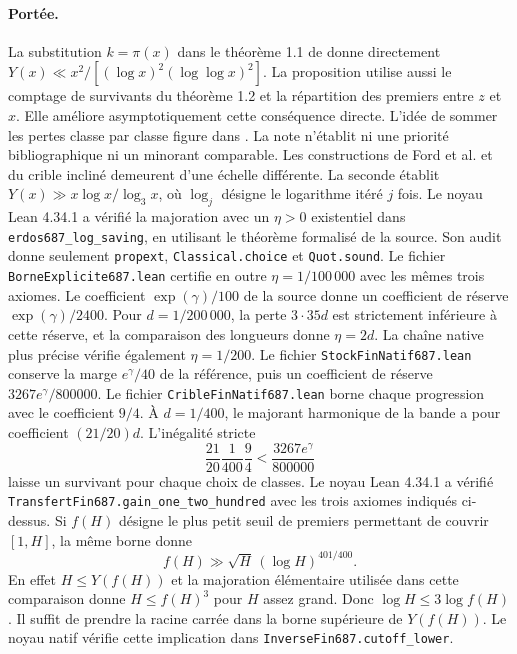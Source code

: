 \documentclass[11pt,a4paper]{article}
\begin{document}
\paragraph{Portée.}
La substitution $k=\pi(x)$ dans le théorème 1.1 de \cite{survivors}
donne directement $Y(x)\ll x^2/[(\log x)^2(\log\log x)^2]$.
La proposition utilise aussi le comptage de survivants du théorème 1.2
et la répartition des premiers entre $z$ et $x$. Elle améliore
asymptotiquement cette conséquence directe. L'idée de sommer les
pertes classe par classe figure dans \cite[section 2.3]{bft}.
La note n'établit
ni une priorité bibliographique ni un minorant comparable.
Les constructions de Ford et al. \cite{fgkmt} et du crible incliné
\cite{tilted} demeurent d'une échelle différente. La seconde établit
$Y(x)\gg x\log x/\log_3 x$, où $\log_j$ désigne le logarithme itéré
$j$ fois. Le noyau Lean 4.34.1 a vérifié la majoration avec un
$\eta>0$ existentiel dans \texttt{erdos687\_log\_saving}, en utilisant le
théorème formalisé de la source. Son audit donne seulement
\texttt{propext}, \texttt{Classical.choice} et \texttt{Quot.sound}.
Le fichier \texttt{BorneExplicite687.lean} certifie en outre
$\eta=1/100\,000$ avec les mêmes trois axiomes. Le coefficient
$\exp(\gamma)/100$ de la source donne un coefficient de réserve
$\exp(\gamma)/2400$. Pour $d=1/200\,000$, la perte $3\cdot35d$
est strictement inférieure à cette réserve, et la comparaison des
longueurs donne $\eta=2d$. La chaîne native plus précise vérifie
également $\eta=1/200$. Le fichier \texttt{StockFinNatif687.lean}
conserve la marge $e^\gamma/40$ de la référence, puis un coefficient
de réserve $3267e^\gamma/800000$. Le fichier \texttt{CribleFinNatif687.lean}
borne chaque progression avec le coefficient $9/4$. À $d=1/400$,
le majorant harmonique de la bande a pour coefficient $(21/20)d$.
L'inégalité stricte
\[
  \frac{21}{20}\frac1{400}\frac94 < \frac{3267e^\gamma}{800000}
\]
laisse un survivant pour chaque choix de classes.
Le noyau Lean 4.34.1 a vérifié \texttt{TransfertFin687.gain\_one\_two\_hundred}
avec les trois axiomes indiqués ci-dessus.
Si $f(H)$ désigne le plus petit seuil de premiers permettant de couvrir
$[1,H]$, la même borne donne
\[
       f(H)\gg \sqrt H\,(\log H)^{401/400}.
\]
En effet $H\le Y(f(H))$ et la majoration élémentaire utilisée dans cette
comparaison donne $H\le f(H)^3$ pour $H$ assez grand. Donc
$\log H\le3\log f(H)$. Il suffit de prendre la racine carrée dans la
borne supérieure de $Y(f(H))$. Le noyau natif vérifie cette implication
dans \texttt{InverseFin687.cutoff\_lower}.
\end{document}
